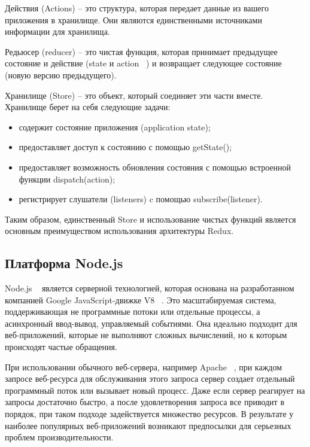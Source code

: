 Действия (Actions) -- это структура, которая передает данные из вашего приложения в хранилище. Они являются единственными источниками информации для хранилища.

Редьюсер (reducer) -- это чистая функция, которая принимает предыдущее состояние и действие (state и action ~\cite{redux_framework}) и возвращает следующее состояние (новую версию предыдущего).

Хранилище (Store) -- это объект, который соединяет эти части вместе. Хранилище берет на себя следующие задачи:
\begin{itemize}
  \item содержит состояние приложения (application state);
  \item предоставляет доступ к состоянию с помощью getState();
  \item предоставляет возможность обновления состояния с помощью встроенной функции dispatch(action);
  \item регистрирует слушатели (listeners) c помощью subscribe(listener).
\end{itemize}

Таким образом, единственный Store и использование чистых функций является основным преимуществом использования архитектуры Redux.


\subsection{Платформа Node.js}
\label{sub:domain:mdl_principle}
Node.js ~\cite{node_js} является серверной технологией, которая основана на разработанном компанией Google JavaScript-движке V8 ~\cite{V8}. Это масштабируемая система, поддерживающая не программные потоки или отдельные процессы, а асинхронный ввод-вывод, управляемый событиями. Она идеально подходит для веб-приложений, которые не выполняют сложных вычислений, но к которым происходят частые обращения.

При использовании обычного веб-сервера, например Apache ~\cite{apache}, при каждом запросе веб-ресурса для обслуживания этого запроса сервер создает отдельный программный поток или вызывает новый процесс. Даже если сервер реагирует на запросы достаточно быстро, а после удовлетворения запроса все приводит в порядок, при таком подходе задействуется множество ресурсов. В результате у наиболее популярных веб-приложений возникают предпосылки для серьезных проблем производительности.

